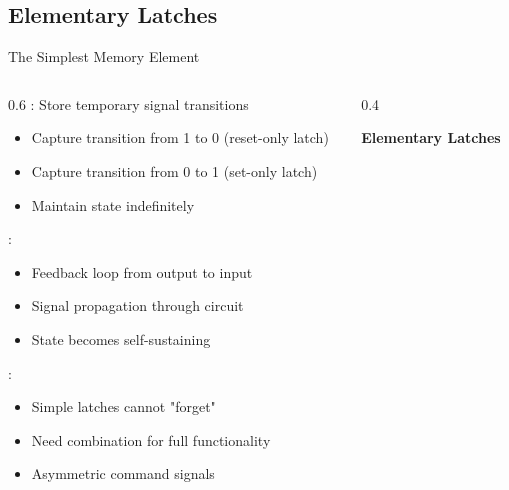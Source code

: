 \subsection{Elementary Latches}
\begin{frame}{The Simplest Memory Element}
\begin{columns}
\begin{column}{0.6\textwidth}
: Store temporary signal transitions
\begin{itemize}
\item Capture transition from 1 to 0 (reset-only latch)
\item Capture transition from 0 to 1 (set-only latch)
\item Maintain state indefinitely
\end{itemize}
\vspace{0.3cm}
:
\begin{itemize}
\item Feedback loop from output to input
\item Signal propagation through circuit
\item State becomes self-sustaining
\end{itemize}
\vspace{0.3cm}
: 
\begin{itemize}
\item Simple latches cannot "forget"
\item Need combination for full functionality
\item Asymmetric command signals
\end{itemize}
\end{column}
\begin{column}{0.4\textwidth}
\begin{center}
\textbf{Elementary Latches}
\vspace{0.3cm}

\end{center}
\end{column}
\end{columns}
\end{frame}

